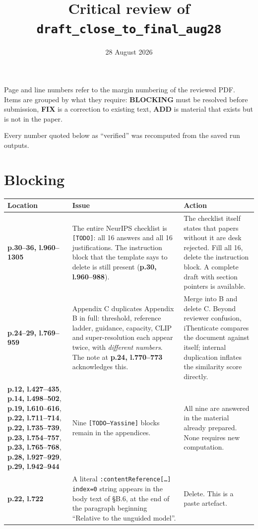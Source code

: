 \documentclass[11pt]{article}
\title{Critical review of \texttt{draft\_close\_to\_final\_aug28}}
\author{}
\date{28 August 2026}
\newcommand{\BLOCK}{\textcolor{blk}{\textbf{BLOCKING}}}
\newcommand{\FIX}{\textcolor{con}{\textbf{FIX}}}
\newcommand{\ADD}{\textcolor{add}{\textbf{ADD}}}
\newcommand{\pl}[2]{\textbf{p.#1, l.#2}}
\begin{document}
\maketitle

Page and line numbers refer to the margin numbering of the reviewed PDF. Items are grouped by
what they require: \BLOCK{} must be resolved before submission, \FIX{} is a correction to
existing text, \ADD{} is material that exists but is not in the paper.

Every number quoted below as ``verified'' was recomputed from the saved run outputs.

\section{Blocking}

\begin{longtable}{@{}p{}p{}p{}@{}}
\toprule
Location & Issue & Action\\
\midrule
\endhead
\pl{30--36}{960--1305} & The entire NeurIPS checklist is \texttt{[TODO]}: all 16 answers and
all 16 justifications. The instruction block that the template says to delete is still present
(\pl{30}{960--988}). & The checklist itself states that papers without it are desk rejected. Fill
all 16, delete the instruction block. A complete draft with section pointers is available.\\
\addlinespace
\pl{24--29}{769--959} & Appendix C duplicates Appendix B in full: threshold, reference ladder,
guidance, capacity, CLIP and super-resolution each appear twice, with \emph{different numbers}.
The note at \pl{24}{770--773} acknowledges this. & Merge into B and delete C. Beyond reviewer
confusion, iThenticate compares the document against itself; internal duplication inflates the
similarity score directly.\\
\addlinespace
\pl{12}{427--435}, \pl{14}{498--502}, \pl{19}{610--616}, \pl{22}{711--714}, \pl{22}{735--739},
\pl{23}{754--757}, \pl{23}{765--768}, \pl{28}{927--929}, \pl{29}{942--944} &
Nine \texttt{[TODO---Yassine]} blocks remain in the appendices. & All nine are answered in the
material already prepared. None requires new computation.\\
\addlinespace
\pl{22}{722} & A literal \texttt{:contentReference}\discretionary{}{}{}\texttt{[\ldots]}%
\discretionary{}{}{}\texttt{index=0} string appears in the body text of \S B.6, at the end of the
paragraph beginning ``Relative to the unguided model''. & Delete. This is a paste artefact.\\
\bottomrule
\end{longtable}
\end{document}
